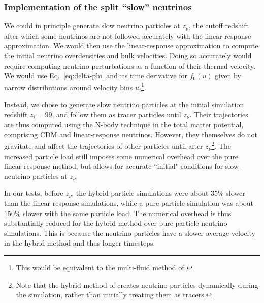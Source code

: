 \documentclass[useAMS, usenatbib]{mnras}
\begin{document}

%

\subsubsection{Implementation of the split ``slow'' neutrinos}

We could in principle generate slow neutrino particles at $z_\nu$, the cutoff redshift after which some neutrinos are not followed accurately with the linear response approximation. We would then use the linear-response approximation to compute the initial neutrino overdensities and bulk velocities. Doing so accurately would require computing neutrino perturbations as a function of their thermal velocity. We would use Eq.~\eqref{eq:delta-phi} and its time derivative for $f_0(u)$ given by narrow distributions around velocity bins $u_i$\footnote{This would be equivalent to the multi-fluid method of \citealt{Dupuy_14}}.

Instead, we chose to generate slow neutrino particles at the initial simulation redshift $z_i = 99$, and follow them as tracer particles until $z_\nu$. Their trajectories are thus computed using the N-body technique in the total matter potential, comprising CDM and linear-response neutrinos. However, they themselves do not gravitate and affect the trajectories of other particles until after $z_\nu$\footnote{Note that the hybrid method of \cite{Brandbyge_2010} creates neutrino particles dynamically during the simulation, rather than initially treating them as tracers.}. The increased particle load still imposes some numerical overhead over the pure linear-response method, but allows for accurate ``initial" conditions for slow-neutrino particles at $z_\nu$.

In our tests, before $z_\nu$, the hybrid particle simulations were about $35\%$ slower than the linear response simulations, while a pure particle simulation was about $150\%$ slower with the same particle load.
The numerical overhead is thus substantially reduced for the hybrid method over pure particle neutrino simulations. This is because the neutrino particles have a slower average velocity in the hybrid method and thus longer timesteps.
\end{document}
